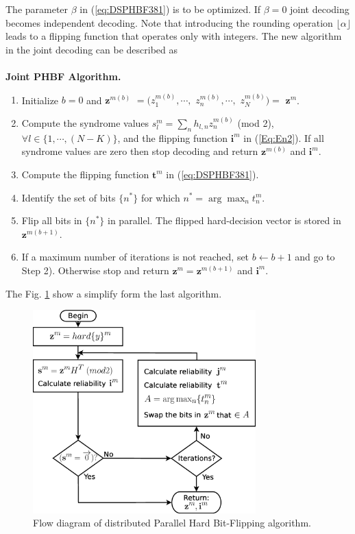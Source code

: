 \documentclass[journal]{IEEEtran}
\newenvironment{algorithm}[1][Algorithm]{\textbf{#1.} }{}
\begin{document}
The parameter $\beta$ in (\ref{eq:DSPHBF381}) is to be optimized. If $\beta = 0 $ 
joint decoding becomes independent decoding.
Note that introducing the rounding operation $\lfloor \alpha \rfloor$ leads to a flipping 
function that operates only with integers.
The new algorithm in the joint decoding can be described as\\ \\
\begin{algorithm}[Joint PHBF Algorithm]
\begin{enumerate}
\item Initialize $b=0$ and $\mathbf{z}^{m(b)}$ $=(z^{m(b)}_1, \cdots,$ $z^{m(b)}_n, \cdots,$ $z^{m(b)}_N)=$ $\mathbf{z}^{m}$.

\item Compute the syndrome values $s^{m}_{l}=\sum_{n} h_{l,n} z^{m(b)}_{n}$ (mod 2), $\forall l \in \{1,\cdots, (N-K)\}$, 
and the  flipping function $\mathbf{i}^{m}$ in (\ref{Eq:En2}).
If all syndrome values are zero then stop decoding and return $\mathbf{z}^{m(b)}$ and $\mathbf{i}^{m}$.


\item  Compute the flipping function $\mathbf{t}^{m}$ in (\ref{eq:DSPHBF381}).

\item Identify the set of bits $\{ n^{*} \}$
for which $n^{*}=\arg \max_{n} t^{m}_{n}$.

\item  Flip  all bits in $\{n^{*} \}$ in parallel. The flipped hard-decision vector is stored in
$\mathbf{z}^{m(b+1)}$.

\item If a maximum number of iterations is not reached, set $b \leftarrow b+1$ and go to Step 2).
 Otherwise stop and return $\mathbf{z}^{m}=\mathbf{z}^{m(b+1)}$ and $\mathbf{i}^{m}$. 
\end{enumerate}
\end{algorithm}
The Fig. \ref{fig:flowdphbf} show a simplify form the last algorithm.
\begin{figure}[h!bt]
\centering
\includegraphics[width=8.6cm]{fig22.eps}
\caption{Flow diagram of distributed Parallel Hard Bit-Flipping algorithm.} \label{fig:flowdphbf}
\end{figure}
\end{document}
